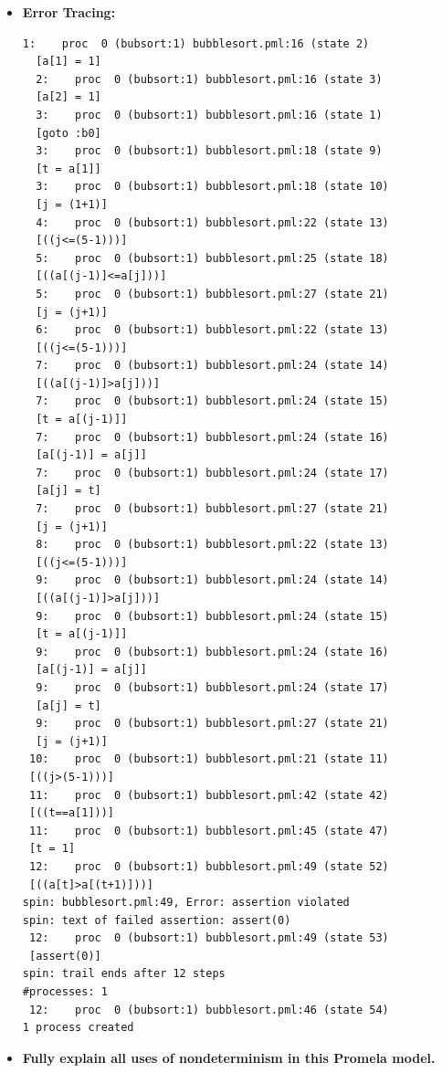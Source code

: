 \documentclass[10pt]{article}
\begin{document}
\begin{enumerate}
\begin{itemize}
\begin{Verbatim}[frame=single]
  \end{Verbatim}
  \item \textbf{Error Tracing:} \\
  \begin{Verbatim}[frame=single]
  1:	proc  0 (bubsort:1) bubblesort.pml:16 (state 2)
  [a[1] = 1]
  2:	proc  0 (bubsort:1) bubblesort.pml:16 (state 3)
  [a[2] = 1]
  3:	proc  0 (bubsort:1) bubblesort.pml:16 (state 1)
  [goto :b0]
  3:	proc  0 (bubsort:1) bubblesort.pml:18 (state 9)
  [t = a[1]]
  3:	proc  0 (bubsort:1) bubblesort.pml:18 (state 10)
  [j = (1+1)]
  4:	proc  0 (bubsort:1) bubblesort.pml:22 (state 13)
  [((j<=(5-1)))]
  5:	proc  0 (bubsort:1) bubblesort.pml:25 (state 18)
  [((a[(j-1)]<=a[j]))]
  5:	proc  0 (bubsort:1) bubblesort.pml:27 (state 21)
  [j = (j+1)]
  6:	proc  0 (bubsort:1) bubblesort.pml:22 (state 13)
  [((j<=(5-1)))]
  7:	proc  0 (bubsort:1) bubblesort.pml:24 (state 14)
  [((a[(j-1)]>a[j]))]
  7:	proc  0 (bubsort:1) bubblesort.pml:24 (state 15)
  [t = a[(j-1)]]
  7:	proc  0 (bubsort:1) bubblesort.pml:24 (state 16)
  [a[(j-1)] = a[j]]
  7:	proc  0 (bubsort:1) bubblesort.pml:24 (state 17)
  [a[j] = t]
  7:	proc  0 (bubsort:1) bubblesort.pml:27 (state 21)
  [j = (j+1)]
  8:	proc  0 (bubsort:1) bubblesort.pml:22 (state 13)
  [((j<=(5-1)))]
  9:	proc  0 (bubsort:1) bubblesort.pml:24 (state 14)
  [((a[(j-1)]>a[j]))]
  9:	proc  0 (bubsort:1) bubblesort.pml:24 (state 15)
  [t = a[(j-1)]]
  9:	proc  0 (bubsort:1) bubblesort.pml:24 (state 16)
  [a[(j-1)] = a[j]]
  9:	proc  0 (bubsort:1) bubblesort.pml:24 (state 17)
  [a[j] = t]
  9:	proc  0 (bubsort:1) bubblesort.pml:27 (state 21)
  [j = (j+1)]
 10:	proc  0 (bubsort:1) bubblesort.pml:21 (state 11)
 [((j>(5-1)))]
 11:	proc  0 (bubsort:1) bubblesort.pml:42 (state 42)
 [((t==a[1]))]
 11:	proc  0 (bubsort:1) bubblesort.pml:45 (state 47)
 [t = 1]
 12:	proc  0 (bubsort:1) bubblesort.pml:49 (state 52)
 [((a[t]>a[(t+1)]))]
spin: bubblesort.pml:49, Error: assertion violated
spin: text of failed assertion: assert(0)
 12:	proc  0 (bubsort:1) bubblesort.pml:49 (state 53)
 [assert(0)]
spin: trail ends after 12 steps
#processes: 1
 12:	proc  0 (bubsort:1) bubblesort.pml:46 (state 54)
1 process created

  \end{Verbatim}
  \item \textbf{Fully explain all uses of nondeterminism in this Promela model.}\\
   

\end{itemize}
\end{enumerate}
\end{document}
